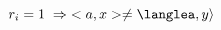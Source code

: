 \documentclass[preview]{standalone}
\begin{document}
\begin{center}
$r_i=1 \hspace{0.1cm}\Rightarrow\hspace{0.1cm} <a, x> \neq \langlea,y\rangle$
\end{center}
\end{document}
